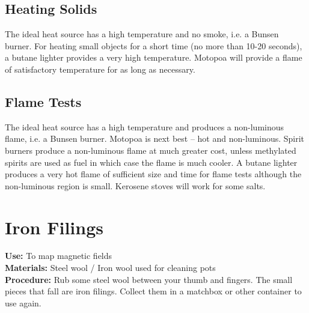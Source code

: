 \begin{multicols}{2}
\subsection{Heating Solids}
The ideal heat source has a high temperature and no smoke, i.e. a Bunsen burner. 
For heating small objects for a short time (no more than 10-20 seconds), 
a butane lighter provides a very high temperature. 
Motopoa will provide a flame of satisfactory temperature 
for as long as necessary.

\subsection{Flame Tests}
The ideal heat source has a high temperature 
and produces a non-luminous flame, i.e. a Bunsen burner. 
Motopoa is next best – hot and non-luminous. 
Spirit burners produce a non-luminous flame at much greater cost, 
unless methylated spirits are used as fuel 
in which case the flame is much cooler. 
A butane lighter produces a very hot flame of sufficient size 
and time for flame tests although the non-luminous region is small. 
Kerosene stoves will work for some salts.


\section{Iron Filings}
\label{sec:iron-filings}
\vspace{-10pt}
\textbf{Use:} To map magnetic fields\\
\textbf{Materials:} Steel wool / Iron wool used for cleaning pots\\
\textbf{Procedure:} Rub some steel wool between your thumb and fingers.  The small pieces that fall are iron filings.  Collect them in a matchbox or other container to use again.


\end{multicols}

